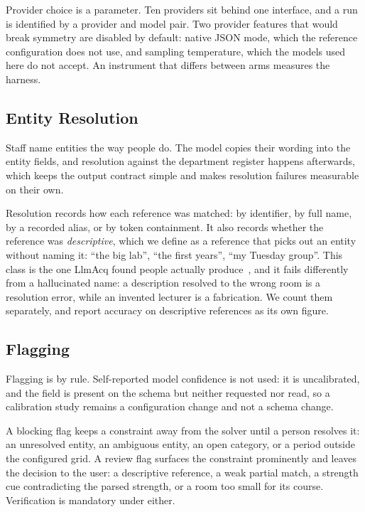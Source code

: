 \documentclass[acmsmall,screen,review,anonymous]{acmart}
\begin{document}
Provider choice is a parameter. Ten providers sit behind one interface, and a
run is identified by a provider and model pair. Two provider features that
would break symmetry are disabled by default: native JSON mode, which the
reference configuration does not use, and sampling temperature, which the
models used here do not accept. An instrument that differs between arms
measures the harness.

\subsection{Entity Resolution}
\label{sec:resolution}

Staff name entities the way people do. The model copies their wording into the
entity fields, and resolution against the department register happens
afterwards, which keeps the output contract simple and makes resolution
failures measurable on their own.

Resolution records how each reference was matched: by identifier, by full
name, by a recorded alias, or by token containment. It also records whether
the reference was \emph{descriptive}, which we define as a reference that
picks out an entity without naming it: ``the big lab'', ``the first years'',
``my Tuesday group''. This class is the one LlmAcq found people actually
produce~\cite{mechqrane2026llmacq}, and it fails differently from a
hallucinated name: a description resolved to the wrong room is a resolution
error, while an invented lecturer is a fabrication. We count them separately,
and report accuracy on descriptive references as its own figure.

\subsection{Flagging}

Flagging is by rule. Self-reported model confidence is not used: it is
uncalibrated, and the field is present on the schema but neither requested nor
read, so a calibration study remains a configuration change and not a schema
change.

A blocking flag keeps a constraint away from the solver until a person
resolves it: an unresolved entity, an ambiguous entity, an open category, or a
period outside the configured grid. A review flag surfaces the constraint
prominently and leaves the decision to the user: a descriptive reference, a
weak partial match, a strength cue contradicting the parsed strength, or a
room too small for its course. Verification is mandatory under either.
\end{document}
